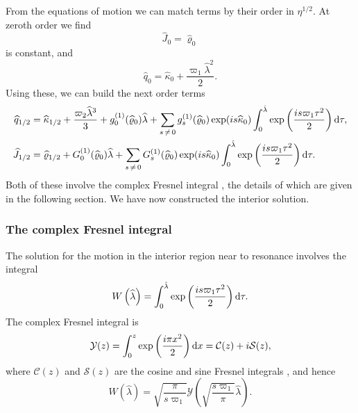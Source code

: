 From the equations of motion we can match terms by their order in $\eta^{1/2}$. At zeroth order we find
\begin{equation}
\widehat{J}_0 = \widehat{\varrho}_0
\end{equation}
is constant, and
\begin{equation}
\widehat{q}_0 = \widehat{\kappa}_0 + \dfrac{\varpi_1\widehat{\lambda}^2}{2}.
\end{equation}
Using these, we can build the next order terms
\begin{align}
\widehat{q}_{1/2} = {} & \widehat{\kappa}_{1/2} + \dfrac{\varpi_2\widehat{\lambda}^3}{3} + g_0^{(1)}(\widehat{\varrho}_0)\widehat{\lambda} + \sum_{s\,\neq\,0}g_s^{(1)}(\widehat{\varrho}_0)\exp(is \widehat{\kappa}_0)\int_{0}^{\hat{\lambda}}{\exp\left(\dfrac{is \varpi_1\tau^2}{2}\right)}\,\mathrm{d}{\tau}, \\
\widehat{J}_{1/2} = {} & \widehat{\varrho}_{1/2} + G_0^{(1)}(\widehat{\varrho}_0)\widehat{\lambda} + \sum_{s\,\neq\,0}G_s^{(1)}(\widehat{\varrho}_0)\exp(is \widehat{\kappa}_0)\int_{0}^{\hat{\lambda}}{\exp\left(\dfrac{is \varpi_1\tau^2}{2}\right)}\,\mathrm{d}{\tau}.
\end{align}
Both of these involve the complex Fresnel integral \citep[chapter 7]{Olver2010}, the details of which are given in the following section. We have now constructed the interior solution.

\subsubsection{The complex Fresnel integral}

The solution for the motion in the interior region near to resonance involves the integral
\begin{equation}
W\left(\widehat{\lambda}\right) = \int_{0}^{\hat{\lambda}}{\exp\left(\dfrac{is \varpi_1\tau^2}{2}\right)}\,\mathrm{d}{\tau}.
\end{equation}
The complex Fresnel integral is
\begin{equation}
\mathcal{Y}(z) = \int_{0}^{z}{\exp\left(\dfrac{i\pi x^2}{2}\right)}\,\mathrm{d}{x} = \mathcal{C}(z) + i\mathcal{S}(z),
\end{equation}
where $\mathcal{C}(z)$ and $\mathcal{S}(z)$ are the cosine and sine Fresnel integrals \citep[7.2.7, 7.2.8]{Olver2010}, and hence
\begin{equation}
W\left(\widehat{\lambda}\right) = \sqrt{\dfrac{\pi}{s\varpi_1}}\mathcal{Y}\left(\sqrt{\dfrac{s\varpi_1}{\pi}}\widehat{\lambda}\right).
\end{equation}

